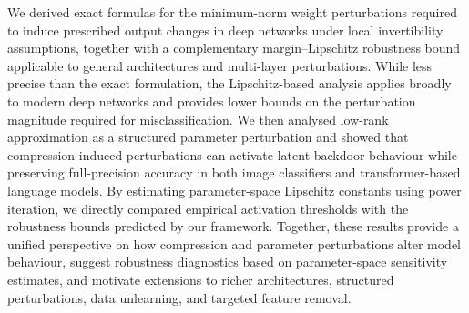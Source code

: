 \documentclass{article}
\theoremstyle{plain}
\theoremstyle{definition}
\theoremstyle{remark}
\begin{document}
We derived exact formulas for the minimum-norm weight perturbations required to induce prescribed output changes in deep networks under local invertibility assumptions, together with a complementary margin--Lipschitz robustness bound applicable to general architectures and multi-layer perturbations. While less precise than the exact formulation, the Lipschitz-based analysis applies broadly to modern deep networks and provides lower bounds on the perturbation magnitude required for misclassification.
We then analysed low-rank approximation as a structured parameter perturbation and showed that compression-induced perturbations can activate latent backdoor behaviour while preserving full-precision accuracy in both image classifiers and transformer-based language models. By estimating parameter-space Lipschitz constants using power iteration, we directly compared empirical activation thresholds with the robustness bounds predicted by our framework. Together, these results provide a unified perspective on how compression and parameter perturbations alter model behaviour, suggest robustness diagnostics based on parameter-space sensitivity estimates, and motivate extensions to richer architectures, structured perturbations, data unlearning, and targeted feature removal.

\end{document}

